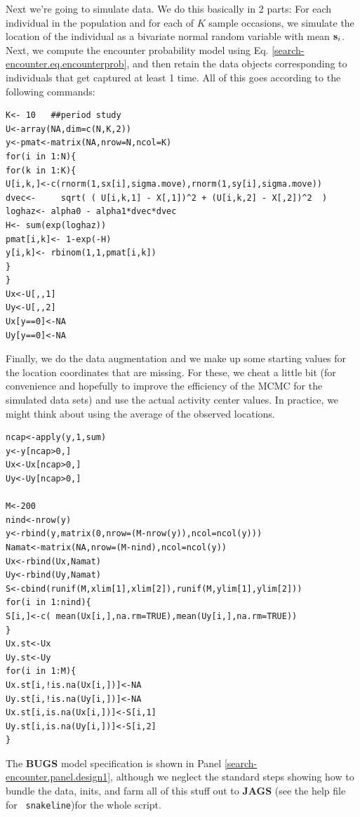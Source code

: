 Next we're going to simulate data. We do this basically in 2 parts:
For each individual in the population and for each of $K$ sample
occasions, we simulate the location of the individual as a bivariate
normal random variable with mean ${\bf s}_i$. Next, we compute the
encounter probability model using
Eq. \ref{search-encounter.eq.encounterprob}, and then retain the
data objects corresponding to individuals that get captured at least 1
time. All of this goes
according to the following commands:
{\small
\begin{verbatim}
K<- 10   ##period study
U<-array(NA,dim=c(N,K,2))
y<-pmat<-matrix(NA,nrow=N,ncol=K)
for(i in 1:N){
for(k in 1:K){
U[i,k,]<-c(rnorm(1,sx[i],sigma.move),rnorm(1,sy[i],sigma.move))
dvec<-     sqrt( ( U[i,k,1] - X[,1])^2 + (U[i,k,2] - X[,2])^2  )
loghaz<- alpha0 - alpha1*dvec*dvec
H<- sum(exp(loghaz))
pmat[i,k]<- 1-exp(-H)
y[i,k]<- rbinom(1,1,pmat[i,k])
}
}
Ux<-U[,,1]
Uy<-U[,,2]
Ux[y==0]<-NA
Uy[y==0]<-NA
\end{verbatim}
}



Finally, we do the data augmentation and we make up some starting
values for the location coordinates that are missing.  For these, we
cheat a little bit (for convenience and hopefully to improve the
efficiency of the MCMC for the simulated data sets) and use the actual
activity center values. In practice, we might think about using the
average of the observed locations.
{\small
\begin{verbatim}
ncap<-apply(y,1,sum)
y<-y[ncap>0,]
Ux<-Ux[ncap>0,]
Uy<-Uy[ncap>0,]

M<-200
nind<-nrow(y)
y<-rbind(y,matrix(0,nrow=(M-nrow(y)),ncol=ncol(y)))
Namat<-matrix(NA,nrow=(M-nind),ncol=ncol(y))
Ux<-rbind(Ux,Namat)
Uy<-rbind(Uy,Namat)
S<-cbind(runif(M,xlim[1],xlim[2]),runif(M,ylim[1],ylim[2]))
for(i in 1:nind){
S[i,]<-c( mean(Ux[i,],na.rm=TRUE),mean(Uy[i,],na.rm=TRUE))
}
Ux.st<-Ux
Uy.st<-Uy
for(i in 1:M){
Ux.st[i,!is.na(Ux[i,])]<-NA
Uy.st[i,!is.na(Uy[i,])]<-NA
Ux.st[i,is.na(Ux[i,])]<-S[i,1]
Uy.st[i,is.na(Uy[i,])]<-S[i,2]
}
\end{verbatim}
}

The {\bf BUGS} model specification is shown in Panel 
\ref{search-encounter.panel.design1}, although we neglect the standard
steps showing how to 
bundle the data, inits, and farm
all of this stuff out to {\bf JAGS} (see the help file for \mbox{\tt
  snakeline})for the whole script.


